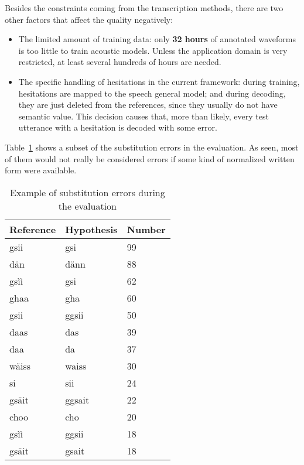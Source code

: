 \documentclass[11pt,a4paper,titlepage,twoside]{article}
\begin{document}
Besides the constraints coming from the transcription methods, there are two other factors that affect the quality negatively:

\begin{itemize}
\item The limited amount of training data: only \textbf{32 hours} of annotated waveforms is too little to train acoustic models. Unless the application domain is very restricted, at least several hundreds of hours are needed.
\item The specific handling of hesitations in the current framework: during training, hesitations are mapped to the speech general model; and during decoding, they are just deleted from the references, since they usually do not have semantic value. This decision causes that, more than likely, every test utterance with a hesitation is decoded with some error.
\end{itemize}

Table~\ref{tab:substitutions-evaluation} shows a subset of the substitution errors in the evaluation. As seen, most of them would not really be considered errors if some kind of normalized written form were available.

\begin{table}[htb!]
  \scriptsize
  \centering
  \begin{tabular}{|l|l|l|}
    \hline
    Reference & Hypothesis & Number \\
    \hline \hline
    gsii & gsi & 99 \\
    dän & dänn & 88 \\
    gsìì & gsi & 62 \\
    ghaa & gha & 60 \\
    gsii & ggsii & 50 \\
    daas & das & 39 \\
    daa & da & 37 \\
    wäiss & waiss & 30 \\
    si & sii & 24 \\
    gsäit & ggsait & 22 \\
    choo & cho & 20 \\
    gsìì & ggsii & 18 \\
    gsäit & gsait & 18 \\
    \hline
  \end{tabular}
  \caption{Example of substitution errors during the evaluation}
  \label{tab:substitutions-evaluation}
\end{table}

\end{document}
